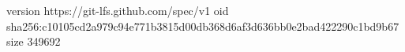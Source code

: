 version https://git-lfs.github.com/spec/v1
oid sha256:c10105cd2a979c94e771b3815d00db368d6af3d636bb0e2bad422290c1bd9b67
size 349692
